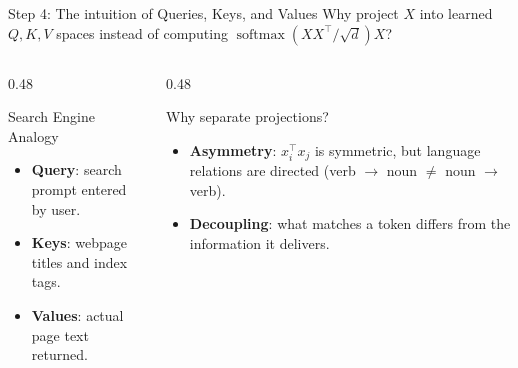 \documentclass[handout]{beamer}
\begin{document}
\begin{frame}{Step 4: The intuition of Queries, Keys, and Values}
  \small Why project $X$ into learned $Q, K, V$ spaces instead of computing $\operatorname{softmax}(XX^\top / \sqrt{d})X$?
  \par\vspace{1pt}
  \centering
  \par\vspace{0pt}
  \begin{columns}[T]
    \begin{column}{0.48\linewidth}
      \begin{block}{Search Engine Analogy}
        \footnotesize
        \begin{itemize}
            \setlength{\itemsep}{1pt}
          \item \textbf{Query}: search prompt entered by user.
          \item \textbf{Keys}: webpage titles and index tags.
          \item \textbf{Values}: actual page text returned.
        \end{itemize}
      \end{block}
    \end{column}
    \begin{column}{0.48\linewidth}
      \begin{alertblock}{Why separate projections?}
        \footnotesize
        \begin{itemize}
            \setlength{\itemsep}{1pt}
          \item \textbf{Asymmetry}: $x_i^\top x_j$ is symmetric, but language relations are directed (verb $\to$ noun $\neq$ noun $\to$ verb).
          \item \textbf{Decoupling}: what matches a token differs from the information it delivers.
        \end{itemize}
      \end{alertblock}
    \end{column}
  \end{columns}
\end{frame}
\end{document}
